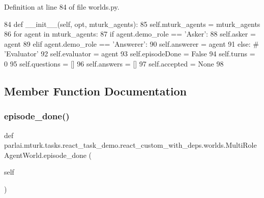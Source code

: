 Definition at line 84 of file worlds.\+py.


\begin{DoxyCode}
84     \textcolor{keyword}{def }\_\_init\_\_(self, opt, mturk\_agents):
85         self.mturk\_agents = mturk\_agents
86         \textcolor{keywordflow}{for} agent \textcolor{keywordflow}{in} mturk\_agents:
87             \textcolor{keywordflow}{if} agent.demo\_role == \textcolor{stringliteral}{'Asker'}:
88                 self.asker = agent
89             \textcolor{keywordflow}{elif} agent.demo\_role == \textcolor{stringliteral}{'Answerer'}:
90                 self.answerer = agent
91             \textcolor{keywordflow}{else}:  \textcolor{comment}{# 'Evaluator'}
92                 self.evaluator = agent
93         self.episodeDone = \textcolor{keyword}{False}
94         self.turns = 0
95         self.questions = []
96         self.answers = []
97         self.accepted = \textcolor{keywordtype}{None}
98 
\end{DoxyCode}


\subsection{Member Function Documentation}
\mbox{\label{classparlai_1_1mturk_1_1tasks_1_1react__task__demo_1_1react__custom__with__deps_1_1worlds_1_1MultiRoleAgentWorld_acacfeaffd24be3c721b94f30684e7679}} 
\subsubsection{\texorpdfstring{episode\+\_\+done()}{episode\_done()}}
{\footnotesize\ttfamily def parlai.\+mturk.\+tasks.\+react\+\_\+task\+\_\+demo.\+react\+\_\+custom\+\_\+with\+\_\+deps.\+worlds.\+Multi\+Role\+Agent\+World.\+episode\+\_\+done (\begin{DoxyParamCaption}\item[{}]{self }\end{DoxyParamCaption})}



